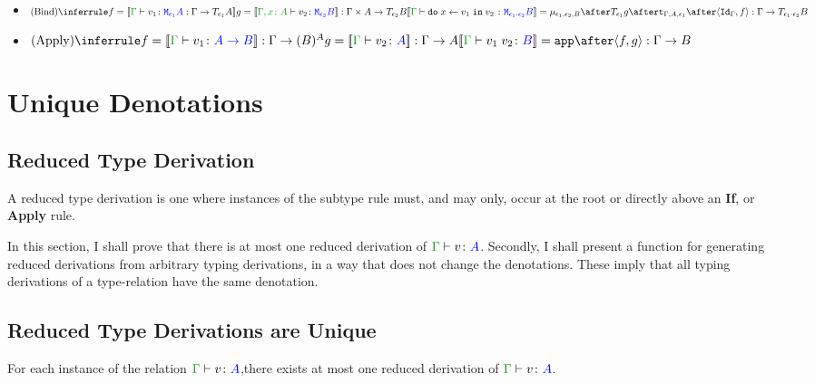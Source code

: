 \documentclass{report}
\begin{document}
\begin{itemize}
    \item $\ntreeruleII{Bind}{f = \deno{\typerelation{\G}{v_1}{\M{\e_1}{A}} : \G \rightarrow \T{\e_1}{A}}}{{ g = \deno{\typerelation{\gax}{v_2}{\M{\e_2}{B}}}}: \G \times A \rightarrow \T{\e_2}{B}}{\deno{\typerelation{\G}{\doin{x}{v_1}{v_2}}{\M{\e_1 \dot \e_2}{B}}} = \bind{\e_1}{\e_2}{B} \after \T{\e_1}{g} \after \tstrength{\G}{A}{\e_1} \after \pr{\idg}{f}: \G \rightarrow \T{\e_1 \dot \e_2}{B}}$ 
    
    \item $\ntreeruleII{Apply}{f = \deno{\gtyperelation{v_1}{\ab}}: \G \rightarrow (B)^{A} }{ g=\deno{\gtyperelation{v_2}{A}}: \G \rightarrow A}{\deno{\gtyperelation{\apply{v_1}{v_2}}{B}}= \app\after\pr{f}{g}: \G \rightarrow B }$
\end{itemize}  

\chapter{Unique Denotations}
 
\section{Reduced Type Derivation}
A reduced type derivation is one where instances of the subtype rule must, and may only, occur at the root or directly above an \textbf{If}, or \textbf{Apply} rule.

In this section, I shall prove that there is at most one reduced derivation of $\gtyperelation{v}{A}$. Secondly, I shall present a function for generating reduced derivations from arbitrary typing derivations, in a way that does not change the denotations. These imply that all typing derivations of a type-relation have the same denotation.

\section{Reduced Type Derivations are Unique}

\begin{theorem}
    For each instance of the relation $\gtyperelation{v}{A}$,there exists at most one reduced derivation of  $\gtyperelation{v}{A}$.  
\end{theorem}
\end{document}
